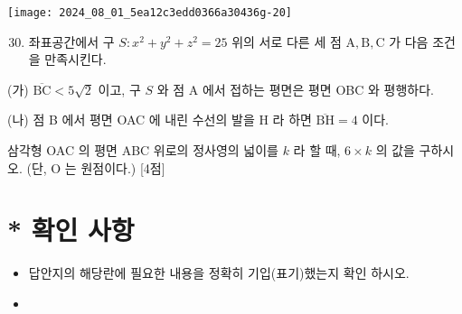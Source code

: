 \documentclass[10pt]{article}
\begin{document}
\begin{center}
\texttt{[image: 2024\_08\_01\_5ea12c3edd0366a30436g-20]}
\end{center}

\begin{enumerate}
  \setcounter{enumi}{29}
  \item 좌표공간에서 구 $S: x^{2}+y^{2}+z^{2}=25$ 위의 서로 다른 세 점 $\mathrm{A}, \mathrm{B}, \mathrm{C}$ 가 다음 조건을 만족시킨다.
\end{enumerate}

(가) $\overline{\mathrm{BC}}<5 \sqrt{2}$ 이고, 구 $S$ 와 점 A 에서 접하는 평면은 평면 OBC 와 평행하다.

(나) 점 B 에서 평면 OAC 에 내린 수선의 발을 H 라 하면 $\overline{\mathrm{BH}}=4$ 이다.

삼각형 OAC 의 평면 ABC 위로의 정사영의 넓이를 $k$ 라 할 때, $6 \times k$ 의 값을 구하시오. (단, O 는 원점이다.) [4점]

\section*{* 확인 사항}
\begin{itemize}
  \item 답안지의 해당란에 필요한 내용을 정확히 기입(표기)했는지 확인 하시오.
\end{itemize}

\begin{itemize}
  \item 
\end{itemize}
\end{document}
